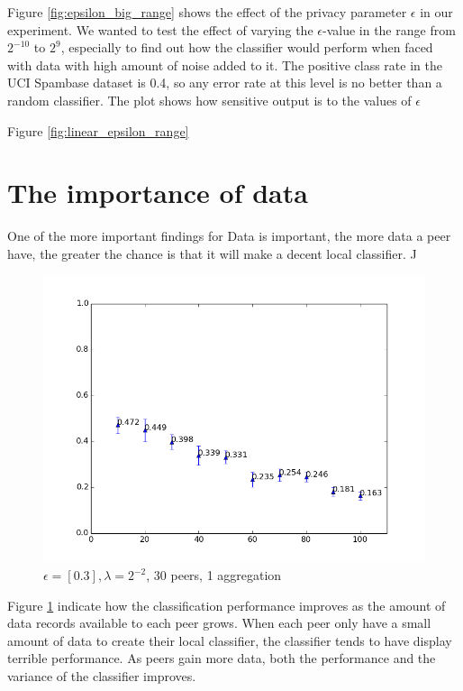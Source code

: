 Figure \ref{fig:epsilon_big_range} shows the effect of the privacy parameter $\epsilon$ in our experiment. We wanted to test the effect of varying the $\epsilon$-value in the range from $2^{-10}$ to $2^9$, especially to find out how the classifier would perform when faced with data with high amount of noise added to it. The positive class rate in the UCI Spambase dataset is 0.4, so any error rate at this level is no better than a random classifier. The plot shows how sensitive output is to the values of $\epsilon$

Figure \ref{fig:linear_epsilon_range} 

\section{The importance of data}
One of the more important findings for 
Data is important, the more data a peer have, the greater the chance is that it will make a decent local classifier. J

\begin{figure}[H]
	\centering
	\includegraphics[width=\textwidth]{fig/eps0.3,budg=eps,peers30,groups5,reg2e-2-pubAll-datalimitTEST}
	\caption{$\epsilon = [0.3], \lambda = 2^{-2}$, 30 peers, 1 aggregation}
	\label{fig:data_limit_test}
\end{figure}

Figure \ref{fig:data_limit_test} indicate how the classification performance improves as the amount of data records available to each peer grows. When each peer only have a small amount of data to create their local classifier, the classifier tends to have display terrible performance. As peers gain more data, both the performance and the variance of the classifier improves.     

